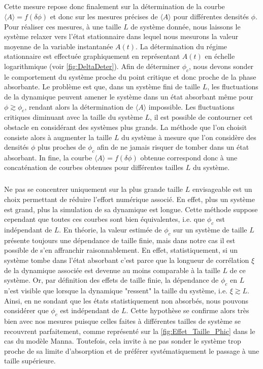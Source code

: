 \subparagraph{}Cette mesure repose donc finalement sur la détermination de la courbe $\langle A \rangle = f(\delta\phi)$ et donc sur les mesures précises de $\langle A \rangle$ pour différentes densités $\phi$. Pour réaliser ces mesures, à une taille $L$ de système donnée, nous laissons le système relaxer vers l'état stationnaire dans lequel nous mesurons la valeur moyenne de la variable instantanée $A(t)$. La détermination du régime stationnaire est effectuée graphiquement en représentant $A(t)$ en échelle logarithmique (voir \autoref{fig:DeltaDeter}). Afin de déterminer $\phi_c$, nous devons sonder le comportement du système proche du point critique et donc proche de la phase absorbante. Le problème est que, dans un système fini de taille $L$, les fluctuations de la dynamique peuvent amener le système dans un état absorbant même pour $\phi \gtrsim \phi_c$, rendant alors la détermination de $\langle A \rangle$ impossible. Les fluctuations critiques diminuant avec la taille du système $L$, il est possible de contourner cet obstacle en considérant des systèmes plus grands. La méthode que l'on choisit consiste alors à augmenter la taille $L$ du système à mesure que l'on considère des densités $\phi$ plus proches de $\phi_c$ afin de ne jamais risquer de tomber dans un état absorbant. In fine, la courbe $\langle A \rangle = f(\delta\phi)$ obtenue correspond donc  à une concaténation de courbes obtenues pour différentes tailles $L$ du système.

\subparagraph{}Ne pas se concentrer uniquement sur la plus grande taille $L$ envisageable est un choix permettant de réduire l'effort numérique associé. En effet, plus un système est grand, plus la simulation de sa dynamique est longue. Cette méthode suppose cependant que toutes ces courbes sont bien équivalentes, i.e. que $\phi_c$ est indépendant de $L$. En théorie, la valeur estimée de $\phi_c$ sur un système de taille $L$ présente toujours une dépendance de taille finie, mais dans notre cas il est possible de s'en affranchir raisonnablement. En effet, statistiquement, si un système tombe dans l'état absorbant c'est parce que la longueur de corrélation $\xi$ de la dynamique associée est devenue au moins comparable à la taille $L$ de ce système. Or, par définition des effets de taille finie, la dépendance de $\phi_c$ en $L$ n'est visible que lorsque la dynamique "ressent" la taille du système, i.e. $\xi \gtrsim L$. Ainsi, en ne sondant que les états statistiquement non absorbés, nous pouvons considérer que $\phi_c$ est indépendant de $L$. Cette hypothèse se confirme alors très bien avec nos mesures puisque celles faites à différentes tailles de système se recouvrent parfaitement, comme représenté sur la \autoref{fig:Effet_Taille_Phic} dans le cas du modèle Manna. Toutefois, cela invite à ne pas sonder le système trop proche de sa limite d'absorption et de préférer systématiquement le passage à une taille supérieure.

